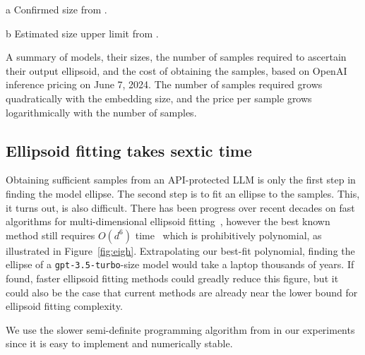 \documentclass{article}
\begin{document}
\begin{table}
  \centering
  \small
  \begin{threeparttable}
  
    \begin{tablenotes}
    \item[a] Confirmed size from \citet{Carlini2024StealingPO}.
    \item[b] Estimated size upper limit from \citet{Finlayson2024LogitsOA}.
    \end{tablenotes}
  \end{threeparttable}
  \caption{
    A summary of models, their sizes, the number of samples required to ascertain their output ellipsoid, and the cost of obtaining the samples, based on OpenAI inference pricing on June 7, 2024. The number of samples required grows quadratically with the embedding size, and the price per sample grows logarithmically with the number of samples.
  }
  \label{tab:price}
\end{table}

\subsection{Ellipsoid fitting takes sextic time}

Obtaining sufficient samples from an API-protected LLM is only the first step in finding the model ellipse. 
The second step is to fit an ellipse to the samples.
This, it turns out, is also difficult. 
There has been progress over recent decades on fast algorithms for multi-dimensional ellipsoid fitting~\citep{Calafiore2002ApproximationON, Ying2012AFA}, however the best known method still requires \(O(d^6)\) time~\citep{Lin2016FastME} which is prohibitively polynomial, as illustrated in Figure~\ref{fig:eigh}. 
Extrapolating our best-fit polynomial, finding the ellipse of a \texttt{gpt-3.5-turbo}-size model would take a laptop thousands of years.
If found, faster ellipsoid fitting methods could greadly reduce this figure,
but it could also be the case that current methods are already near the lower bound for ellipsoid fitting complexity.

We use the slower semi-definite programming algorithm from \citet{Ying2012AFA} in our experiments since it is easy to implement and numerically stable.
\end{document}
